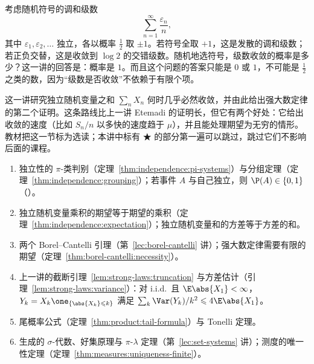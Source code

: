 \label{lec:random-series}

考虑随机符号的调和级数
\[
\sum_{n=1}^\infty\frac{\varepsilon_n}n,
\]
其中 $\varepsilon_1,\varepsilon_2,\dots$ 独立，各以概率 $\frac12$ 取 $\pm1$。若符号全取 $+1$，这是发散的调和级数；若正负交替，这是收敛到 $\log2$ 的交错级数。随机地选符号，级数收敛的概率是多少？这一讲的回答是：概率是 $1$。而且这个问题的答案只能是 $0$ 或 $1$，不可能是 $\frac12$ 之类的数，因为“级数是否收敛”不依赖于有限个项。

这一讲研究独立随机变量之和 $\sum_nX_n$ 何时几乎必然收敛，并由此给出强大数定律的第二个证明。这条路线比上一讲 Etemadi 的证明长，但它有两个好处：它给出收敛的速度（比如 $S_n/n$ 以多快的速度趋于 $\mu$），并且能处理期望为无穷的情形。教材把这一节标为选读；本讲中标有 ★ 的部分第一遍可以跳过，跳过它们不影响后面的课程。


\begin{enumerate}
\item 独立性的 $\pi$-类判别（定理~\ref{thm:independence:pi-systems}）与分组定理（定理~\ref{thm:independence:grouping}）；若事件 $A$ 与自己独立，则 $\P(A)\in\{0,1\}$（）。
\item 独立随机变量乘积的期望等于期望的乘积（定理~\ref{thm:independence:expectation}）；独立随机变量和的方差等于方差的和。
\item 两个 Borel--Cantelli 引理（第~\ref{lec:borel-cantelli} 讲）；强大数定律需要有限的期望（定理~\ref{thm:borel-cantelli:necessity}）。
\item 上一讲的截断引理~\ref{lem:strong-laws:truncation} 与方差估计（引理~\ref{lem:strong-laws:variance}）：对 i.i.d.\ 且 $\E\abs{X_1}<\infty$，$Y_k=X_k\one_{\{\abs{X_k}\leqslant k\}}$ 满足 $\sum_k\Var(Y_k)/k^2\leqslant4\E\abs{X_1}$。
\item 尾概率公式（定理~\ref{thm:product:tail-formula}）与 Tonelli 定理。
\item 生成的 $\sigma$-代数、好集原理与 $\pi$-$\lambda$ 定理（第~\ref{lec:set-systems} 讲）；测度的唯一性定理（定理~\ref{thm:measures:uniqueness-finite}）。
\end{enumerate}

